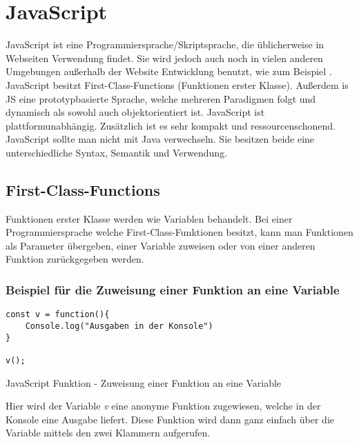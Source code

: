 \section{JavaScript}
\label{js}

JavaScript ist eine Programmiersprache/Skriptsprache, die üblicherweise in Webseiten Verwendung 
findet. Sie wird jedoch auch noch in vielen anderen Umgebungen außerhalb der Website Entwicklung
benutzt, wie zum Beispiel \underline{}. 
JavaScript besitzt First-Class-Functions (Funktionen erster Klasse). 
Außerdem is JS eine prototypbasierte Sprache, welche mehreren Paradigmen folgt und dynamisch als sowohl auch 
objektorientiert ist. JavaScript ist plattformunabhängig. Zusätzlich ist es sehr kompakt und 
ressourcenschonend. JavaScript sollte man nicht mit Java verwechseln. 
Sie besitzen beide eine unterschiedliche Syntax, Semantik und Verwendung.~\cite{JS}

\subsection{First-Class-Functions}
Funktionen erster Klasse werden wie Variablen behandelt. Bei einer Programmiersprache welche 
First-Class-Funktionen besitzt, kann man Funktionen als Parameter übergeben, einer Variable 
zuweisen oder von einer anderen Funktion zurückgegeben werden.~\cite{First-Class-Funktion}

\subsubsection{Beispiel für die Zuweisung einer Funktion an eine Variable}
\begin{code}[htp]
\begin{lstlisting}
const v = function(){
    Console.log("Ausgaben in der Konsole")
}
    
v();
\end{lstlisting}
\caption{JavaScript Funktion - Zuweisung einer Funktion an eine Variable}
\end{code}
Hier wird der Variable \textit{v} eine anonyme Funktion zugewiesen, welche in der Konsole 
eine Ausgabe liefert. Diese Funktion wird dann ganz einfach über die Variable mittels den zwei 
Klammern aufgerufen.

\newpage

